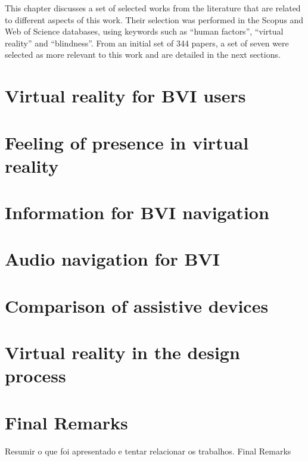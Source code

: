 This chapter discusses a set of selected works from the literature that are related to different aspects of this work. Their selection was performed in the Scopus and Web of Science databases, using keywords such as “human factors”, “virtual reality” and “blindness”. From an initial set of 344 papers, a set of seven were selected as more relevant to this work and are detailed in the next sections.

\section{Virtual reality for BVI users}
\label{sec:vr_without_vision}


\section{Feeling of presence in virtual reality}
\label{sec:emotion_presence_vr}


\section{Information for BVI navigation}
\label{sec:bradley_dunlop}


\section{Audio navigation for BVI}
\label{sec:auditory_navigation}


\section{Comparison of assistive devices}
\label{sec:evaluation_spatial_display}


\section{Virtual reality in the design process}
\label{sec:vr_cabin}


\section{Final Remarks}
\label{sec:final_remarks3}

Resumir o que foi apresentado e tentar relacionar os trabalhos.
Final Remarks

